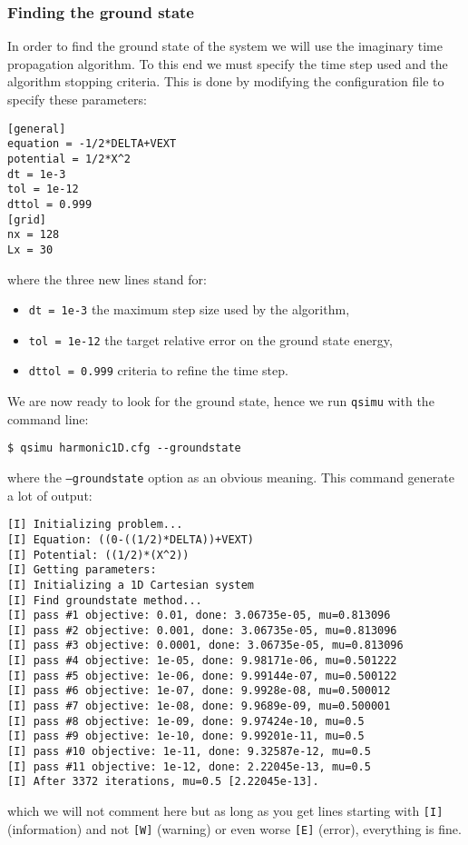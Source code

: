 \documentclass[12pt,a4paper]{report}
\newcommand{\qsimu}{\texttt{qsimu}{} }
\begin{document}
\subsubsection{Finding the ground state}
In order to find the ground state of the system we will use the imaginary time propagation algorithm.
To this end we must specify the time step used and the algorithm stopping criteria.
This is done by modifying the configuration file to specify these parameters:
\begin{verbatim}
[general]
equation = -1/2*DELTA+VEXT
potential = 1/2*X^2
dt = 1e-3
tol = 1e-12
dttol = 0.999
[grid]
nx = 128
Lx = 30
\end{verbatim}
where the three new lines stand for:
\begin{itemize}
\item\texttt{dt = 1e-3} the maximum step size used by the algorithm,
\item\texttt{tol = 1e-12} the target relative error on the ground state energy,
\item\texttt{dttol = 0.999} criteria to refine the time step.
\end{itemize}

We are now ready to look for the ground state, hence we run \qsimu with the command line:
\begin{verbatim}
$ qsimu harmonic1D.cfg --groundstate
\end{verbatim}
where the \texttt{--groundstate} option as an obvious meaning.
This command generate a lot of output:
\begin{verbatim}
[I] Initializing problem...
[I] Equation: ((0-((1/2)*DELTA))+VEXT)
[I] Potential: ((1/2)*(X^2))
[I] Getting parameters:
[I] Initializing a 1D Cartesian system
[I] Find groundstate method...
[I]	pass #1 objective: 0.01, done: 3.06735e-05, mu=0.813096
[I]	pass #2 objective: 0.001, done: 3.06735e-05, mu=0.813096
[I]	pass #3 objective: 0.0001, done: 3.06735e-05, mu=0.813096
[I]	pass #4 objective: 1e-05, done: 9.98171e-06, mu=0.501222
[I]	pass #5 objective: 1e-06, done: 9.99144e-07, mu=0.500122
[I]	pass #6 objective: 1e-07, done: 9.9928e-08, mu=0.500012
[I]	pass #7 objective: 1e-08, done: 9.9689e-09, mu=0.500001
[I]	pass #8 objective: 1e-09, done: 9.97424e-10, mu=0.5
[I]	pass #9 objective: 1e-10, done: 9.99201e-11, mu=0.5
[I]	pass #10 objective: 1e-11, done: 9.32587e-12, mu=0.5
[I]	pass #11 objective: 1e-12, done: 2.22045e-13, mu=0.5
[I] After 3372 iterations, mu=0.5 [2.22045e-13].
\end{verbatim}
which we will not comment here but as long as you get lines starting with \texttt{[I]} (information) and not \texttt{[W]} (warning) or even worse \texttt{[E]} (error), everything is fine.
\end{document}
